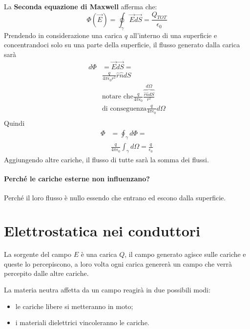 \documentclass[a4paper, 12pt]{book}
\theoremstyle{plain}
\begin{document}
La \textbf{Seconda equazione di Maxwell} afferma che: \[\Phi(\vec{E}) = \oint_{\gamma}\vec{E}\vec{dS} = \frac{Q_{TOT}}{\epsilon_0}\]
Prendendo in considerazione una carica $q$ all'interno di una superficie e concentrandoci solo su una parte della superficie, il flusso generato dalla carica sarà 
\[
\begin{split}
	d\Phi &= \vec{E}\vec{dS}= \\
	&\frac{q}{4\pi\epsilon_0r^2}\hat{r}\hat{n}dS \\
	&\text{notare che}
	\frac{q}{4\pi \epsilon_0}\overbrace{\frac{\hat{r}\hat{n}dS}{r^2}}^{d\Omega} \\
	&\text{di conseguenza} 
	\frac{q}{4\pi \epsilon_0}d\Omega \\
\end{split}
\]
Quindi
\[
\begin{split}
\Phi &= \oint_{\gamma} d\Phi = \\
&\frac{q}{4\pi \epsilon_0}\int_{\gamma}d\Omega = \frac{q}{\epsilon_0}
\end{split}
\]
Aggiungendo altre cariche, il flusso di tutte sarà la somma dei flussi.
\paragraph{Perché le cariche esterne non influenzano?}
Perché il loro flusso è nullo essendo che entrano ed escono dalla superficie.

\section{Elettrostatica nei conduttori}
La sorgente del campo $E$ è una carica ${Q}$, il campo generato 
agisce sulle cariche e queste lo percepiscono, a loro volta ogni 
carica genererà un campo che verrà percepito dalle altre cariche.

La materia neutra affetta da un campo reagirà in due possibili modi:
\begin{itemize}
    \item le cariche libere si metteranno in moto;
    \item i materiali dielettrici vincoleranno le cariche.
\end{itemize}
\end{document}

